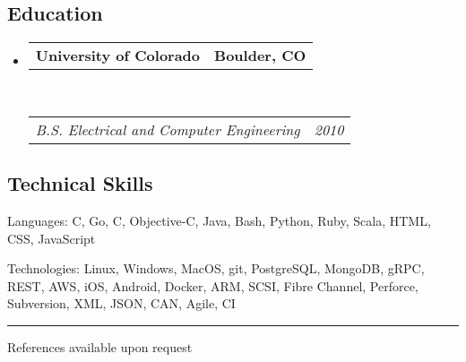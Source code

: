 \documentclass[11pt,letterpaper]{article}
\makeatletter
\newenvironment{indentsection}[1]%
{\begin{list}{}%
	{\setlength{\leftmargin}{#1}}%
	\item[]%
}
{\end{list}}
\newcommand{\headerrow}[2]
{\begin{tabular*}{\linewidth}{l@{\extracolsep{\fill}}r}
	#1 &
	#2 \\
\end{tabular*}}
\newcommand{\CPP}
{C\nolinebreak[4]\hspace{-.05em}\raisebox{.22ex}{\footnotesize\bf ++}}
\makeatother
\begin{document}
\vspace{-0.4em}
\subsection*{Education}

\begin{itemize}
	\parskip=0.1em

	\item 
	\headerrow
		{\textbf{University of Colorado}}
		{\textbf{Boulder, CO}}
	\\
	\headerrow
		{\emph{B.S. Electrical and Computer Engineering}}
		{\emph{2010}}

\end{itemize}


\vspace{-0.4em}
\subsection*{Technical Skills}

\begin{indentsection}{\parindent}
\begin{description*}
	\item[Languages:]
	\CPP, Go, C, Objective-C, Java, Bash, Python, Ruby, Scala, HTML, CSS, JavaScript
    \vspace{0.4em}
	\item[Technologies:]
	Linux, Windows, MacOS, git, PostgreSQL, MongoDB, gRPC, REST, AWS, iOS, Android, Docker, ARM, SCSI, Fibre Channel, Perforce, Subversion, XML, JSON, CAN, Agile, CI
\end{description*}


\vspace{0.6em}
\hrule
\vspace{0.4em}
References available upon request
\end{indentsection}
\end{document}

